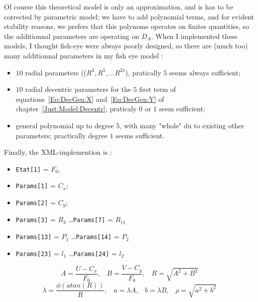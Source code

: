 Of course this theoretical model is only an approximation,  and is has to be corrected
by parametric model; we have to add polynomial terms, and for evident stability reasons,
we prefers that this polynoms operates on finites quantities, so the additionnal 
parameters are operating on $D_A$.  When I implemented these models, I  thought
fish-eye were always poorly designed, so there are (much too) many additionnal
parameters in my fish eye model :


\begin{itemize}
   \item $10$  radial parameters (($R^3, R^5 , \dots R^{21}$), pratically $5$ seems
          always sufficient;

   \item $10$ radial decentric parameters for the $5$ first term of equations~\ref{Eq:DecGen:X}
         and~\ref{Eq:DecGen:Y} of chapter~\ref{Just:Model:Decentr}; praticaly $0$ or $1$
         seem sufficient;

   \item general polynomial up to degree $5$, with many "whole" du to existing other parameters;
         practically degree $1$ seems sufficient.

\end{itemize}

Finally, the XML-implemention is :

\begin{itemize}
    \item   {\tt Etat[1]} = $F_0$,  
    \item  {\tt Params[1]} = $C_x$;
    \item  {\tt Params[2]} = $C_y$;
    \item  {\tt Params[3]} =  $R_3$ \dots {\tt Params[7]} =  $R_{11}$
    \item  {\tt Params[13]} =  $P_1$ \dots {\tt Params[14]} =  $P_2$
    \item  {\tt Params[23]} =  $l_1$ \dots {\tt Params[24]} =  $l_2$
\end{itemize}

\begin{equation}
    A=\frac{U-C_x}{F_0}
    ,\;\;\;  B=\frac{V-C_y}{F_0}
    ,\;\;\; R=\sqrt{A^2 + B^2}
\end{equation}
\begin{equation}
    \lambda=  \frac{\phi(atan(R))}{R}
    ,\;\;\; a = \lambda A
    ,\;\;\; b = \lambda B
    ,\;\;\; \rho = \sqrt{a^2 + b^2}
\end{equation}



